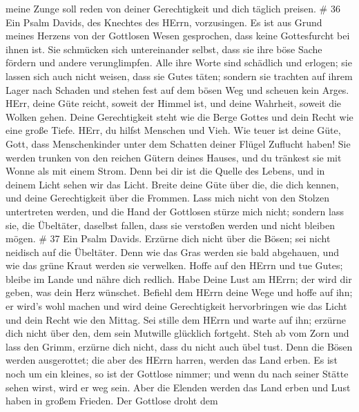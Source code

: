 meine Zunge soll reden von deiner Gerechtigkeit und dich täglich
preisen. \# 36  Ein Psalm Davids, des Knechtes des HErrn,
vorzusingen.  Es ist aus Grund meines Herzens von der
Gottlosen Wesen gesprochen, dass keine Gottesfurcht bei ihnen ist.
 Sie schmücken sich untereinander selbst, dass sie ihre böse
Sache fördern und andere verunglimpfen.  Alle ihre Worte
sind schädlich und erlogen; sie lassen sich auch nicht weisen, dass sie
Gutes täten;  sondern sie trachten auf ihrem Lager nach
Schaden und stehen fest auf dem bösen Weg und scheuen kein Arges.
 HErr, deine Güte reicht, soweit der Himmel ist, und deine
Wahrheit, soweit die Wolken gehen.  Deine Gerechtigkeit
steht wie die Berge Gottes und dein Recht wie eine große Tiefe. HErr, du
hilfst Menschen und Vieh.  Wie teuer ist deine Güte, Gott,
dass Menschenkinder unter dem Schatten deiner Flügel Zuflucht haben!
 Sie werden trunken von den reichen Gütern deines Hauses,
und du tränkest sie mit Wonne als mit einem Strom.  Denn
bei dir ist die Quelle des Lebens, und in deinem Licht sehen wir das
Licht.  Breite deine Güte über die, die dich kennen, und
deine Gerechtigkeit über die Frommen.  Lass mich nicht von
den Stolzen untertreten werden, und die Hand der Gottlosen stürze mich
nicht;  sondern lass sie, die Übeltäter, daselbst fallen,
dass sie verstoßen werden und nicht bleiben mögen. \# 37 
Ein Psalm Davids. Erzürne dich nicht über die Bösen; sei nicht neidisch
auf die Übeltäter.  Denn wie das Gras werden sie bald
abgehauen, und wie das grüne Kraut werden sie verwelken. 
Hoffe auf den HErrn und tue Gutes; bleibe im Lande und nähre dich
redlich.  Habe Deine Lust am HErrn; der wird dir geben, was
dein Herz wünschet.  Befiehl dem HErrn deine Wege und hoffe
auf ihn; er wird's wohl machen  und wird deine Gerechtigkeit
hervorbringen wie das Licht und dein Recht wie den Mittag. 
Sei stille dem HErrn und warte auf ihn; erzürne dich nicht über den, dem
sein Mutwille glücklich fortgeht.  Steh ab vom Zorn und lass
den Grimm, erzürne dich nicht, dass du nicht auch übel tust.
 Denn die Bösen werden ausgerottet; die aber des HErrn
harren, werden das Land erben.  Es ist noch um ein kleines,
so ist der Gottlose nimmer; und wenn du nach seiner Stätte sehen wirst,
wird er weg sein.  Aber die Elenden werden das Land erben
und Lust haben in großem Frieden.  Der Gottlose droht dem
